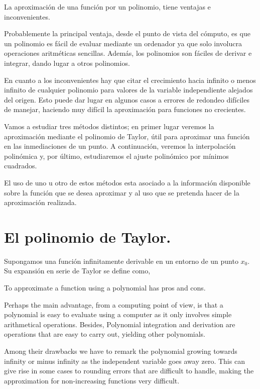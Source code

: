\begin{paracol}{2}
La aproximación de una función por un polinomio, tiene ventajas e inconvenientes. 

Probablemente la principal ventaja, desde el punto de vista del cómputo, es que un polinomio es fácil de evaluar  mediante un ordenador ya que solo involucra operaciones aritméticas sencillas. Además, los polinomios son fáciles de derivar e integrar, dando lugar a otros polinomios.

En cuanto a los inconvenientes hay que citar el crecimiento hacia infinito o menos infinito de cualquier polinomio para valores de la variable independiente alejados del origen. Esto puede dar lugar en algunos casos a errores de redondeo difíciles de manejar, haciendo muy difícil la aproximación para funciones no crecientes.

Vamos a estudiar tres métodos distintos; en primer lugar veremos la aproximación mediante el polinomio de Taylor, útil para aproximar una función en las inmediaciones de un punto. A continuación,  veremos la interpolación polinómica y, por último, estudiaremos el ajuste polinómico por mínimos cuadrados.

El uso de uno u otro de estos métodos esta asociado a la información disponible sobre la función que se desea aproximar y al uso que se pretenda hacer de la aproximación realizada.


\section{El polinomio de Taylor.}

Supongamos una función infinitamente derivable en un entorno de un punto $x_0$. Su expansión en serie de Taylor se define como,

\switchcolumn
To approximate a function using  a polynomial has pros and cons. 

Perhaps the main advantage, from a computing point of view, is that a polynomial is easy to evaluate using a computer as it only involves simple arithmetical operations. Besides, Polynomial integration and derivation are operations that are easy to carry out, yielding other polynomials. 

Among their drawbacks we have to remark the polynomial growing towards infinity or minus infinity as the independent variable goes away zero. This can give rise in some cases to rounding errors that are difficult to handle, making the approximation for non-increasing functions very difficult.


\end{paracol}
